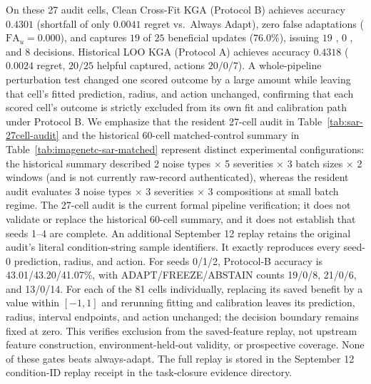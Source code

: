 On these 27 audit cells, Clean Cross-Fit KGA (Protocol B) achieves accuracy $0.4301$ (shortfall of only $0.0041$ regret vs.\ Always Adapt), zero false adaptations ($\mathrm{FA}_u = 0.000$), and captures $19$ of $25$ beneficial updates ($76.0\%$), issuing $19$ \adapt, $0$ \freeze, and $8$ \abstain decisions. Historical LOO KGA (Protocol A) achieves accuracy $0.4318$ ($0.0024$ regret, $20/25$ helpful captured, actions $20/0/7$). A whole-pipeline perturbation test changed one scored outcome by a large amount while leaving that cell's fitted prediction, radius, and action unchanged, confirming that each scored cell's outcome is strictly excluded from its own fit and calibration path under Protocol B.
We emphasize that the resident 27-cell audit in Table~\ref{tab:sar-27cell-audit} and the historical 60-cell matched-control summary in Table~\ref{tab:imagenetc-sar-matched} represent distinct experimental configurations: the historical summary described 2 noise types $\times$ 5 severities $\times$ 3 batch sizes $\times$ 2 windows (and is not currently raw-record authenticated), whereas the resident audit evaluates 3 noise types $\times$ 3 severities $\times$ 3 compositions at small batch regime. The 27-cell audit is the current formal pipeline verification; it does not validate or replace the historical 60-cell summary, and it does not establish that seeds 1--4 are complete.
An additional September 12 replay retains the original audit's literal condition-string
sample identifiers. It exactly reproduces every seed-0 prediction, radius, and action.
For seeds 0/1/2, Protocol-B accuracy is 43.01/43.20/41.07\%, with
ADAPT/FREEZE/ABSTAIN counts 19/0/8, 21/0/6, and 13/0/14. For each of the
81 cells individually, replacing its saved benefit by a value within $[-1,1]$
and rerunning fitting and calibration leaves its prediction, radius, interval
endpoints, and action unchanged; the decision boundary remains fixed at zero.
This verifies exclusion from the saved-feature replay, not upstream feature
construction, environment-held-out validity, or prospective coverage. None of
these gates beats always-adapt. The full replay is stored in the September 12
condition-ID replay receipt in the task-closure evidence directory.


